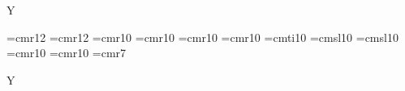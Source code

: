 
\if Y\abcmusix%

\else%




\fi


\vsize=9.5in
\hsize=6.0in
\voffset=0.0in
\hoffset=0.0in

\raggedbottom
\nopagenumbers



\font\Xfont=cmr12
\font\Tfont=cmr12
\font\Tafont=cmr10 %
\font\Tbfont=cmr10 %
\font\Tifont=cmr10 %
\font\Wfont=cmr10
\font\Sfont=cmti10
\font\Cfont=cmsl10
\font\Afont=cmsl10
\font\Nfont=cmr10
\font\Pfont=cmr10
\font\gfont=cmr7   %


\if Y\abcmusix%
\smallmusicsize
\nobarnumbers
\else%
\relax
\def\freqbarno{99}
\fi
\def\stdafterruleskip{2\Internote}
\parindent 0pt

\let\tune=\vbox




\def\header{%
\hbox to\hsize{\Tfont \Tstring\ %
\hfil%
\if Y\Ctrue{\Cfont\Cstring}\ \fi%
\if Y\Atrue{\Afont(\Astring)}\fi%
}\nobreak%
\if Y\Ntrue{\line{\Nfont \Nstring\hfil}\nobreak}\fi%
\if Y\Tatrue{\line{\Tafont Also known as: \Tastring\hfil}\nobreak}\fi%
\if Y\Tbtrue{\Tbfont Also known as: \Tbstring}\fi%
\if Y\Ptrue{\line{\Pfont Play \Pstring\hfil}\nobreak}\fi%
}

\def\Tline#1{\medskip\line{\Tifont #1\hfil}}
\def\Wline#1{\smallskip\centerline{\Wfont #1}}
\def\Pline#1{\notes\uptext{\Pfont [#1]}\enotes\relax}


